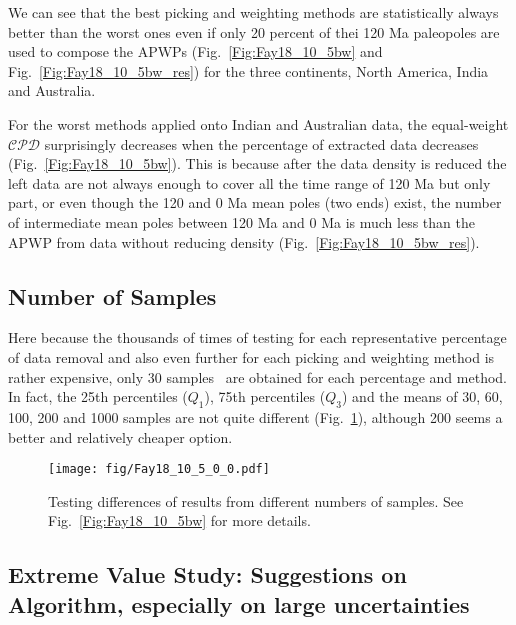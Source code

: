 We can see that the best picking and weighting methods are statistically always
better than the worst ones even if only 20 percent of thei 120 Ma
paleopoles are used to compose the APWPs (Fig.~\ref{Fig:Fay18_10_5bw} and
Fig.~\ref{Fig:Fay18_10_5bw_res}) for the three continents, North America, India
and Australia.

For the worst methods applied onto Indian and Australian data, the equal-weight
$\mathcal{CPD}$ surprisingly decreases when the percentage of extracted data
decreases (Fig.~\ref{Fig:Fay18_10_5bw}). This is because after the data density
is reduced the left data are not always enough to cover all the time range of
120 Ma but only part, or even though the 120 and 0 Ma mean poles
(two ends) exist, the number of intermediate mean poles between 120 Ma and 0 Ma
is much less than the APWP from data without reducing density
(Fig.~\ref{Fig:Fay18_10_5bw_res}).

\subsection{Number of Samples}
Here because the thousands of times of testing for each representative
percentage of data removal and also even further for each picking and weighting
method is rather expensive, only 30 samples~\citep[a rule of thumb; e.g.][says
``greater than 25 or 30'']{H19} are obtained for each percentage and method. In
fact, the 25th percentiles ($Q_1$), 75th percentiles ($Q_3$) and the means of
30, 60, 100, 200 and 1000 samples are not quite different
(Fig.~\ref{Fig:Fay18_10_5_0_0}), although 200 seems a better and relatively
cheaper option.

\begin{figure}
    \centering
        \texttt{[image: fig/Fay18\_10\_5\_0\_0.pdf]}
    \captionsetup{width=.95\textwidth}
    \caption{Testing differences of results from different numbers of samples.
	See Fig.~\ref{Fig:Fay18_10_5bw} for more details.}\label{Fig:Fay18_10_5_0_0}
\end{figure}


\subsection{Extreme Value Study: Suggestions on Algorithm, especially on large
uncertainties}

